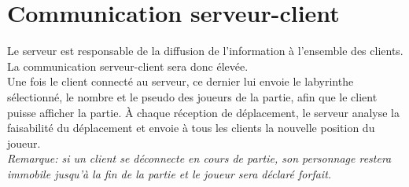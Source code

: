     \section{Communication serveur-client}
        Le serveur est responsable de la diffusion de l'information à l'ensemble des clients. La communication serveur-client sera donc élevée. \\

        Une fois le client connecté au serveur, ce dernier lui envoie le labyrinthe sélectionné, le nombre et le pseudo des joueurs de la partie, afin que le client puisse afficher la partie. À chaque réception de déplacement, le serveur analyse la faisabilité du déplacement et envoie à tous les clients la nouvelle position du joueur. \\

        \emph{Remarque: si un client se déconnecte en cours de partie, son personnage restera immobile jusqu'à la fin de la partie et le joueur sera déclaré forfait.}
